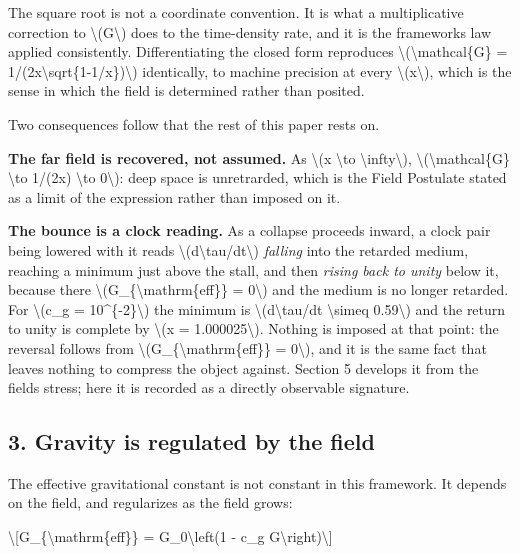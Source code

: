 \documentclass[
  10pt,
]{article}
\begin{document}
The square root is not a coordinate convention. It is what a
multiplicative correction to \textbackslash(G\textbackslash) does to the
time-density rate, and it is the framework\textquotesingle s law applied
consistently. Differentiating the closed form reproduces
\textbackslash(\textbackslash mathcal\{G\} =
1/(2x\textbackslash sqrt\{1-1/x\})\textbackslash) identically, to
machine precision at every \textbackslash(x\textbackslash), which is the
sense in which the field is determined rather than posited.

Two consequences follow that the rest of this paper rests on.

\textbf{The far field is recovered, not assumed.} As \textbackslash(x
\textbackslash to \textbackslash infty\textbackslash),
\textbackslash(\textbackslash mathcal\{G\} \textbackslash to 1/(2x)
\textbackslash to 0\textbackslash): deep space is unretrarded, which is
the Field Postulate stated as a limit of the expression rather than
imposed on it.

\textbf{The bounce is a clock reading.} As a collapse proceeds inward, a
clock pair being lowered with it reads
\textbackslash(d\textbackslash tau/dt\textbackslash) \emph{falling} into
the retarded medium, reaching a minimum just above the stall, and then
\emph{rising back to unity} below it, because there
\textbackslash(G\_\{\textbackslash mathrm\{eff\}\} = 0\textbackslash)
and the medium is no longer retarded. For \textbackslash(c\_g =
10\^{}\{-2\}\textbackslash) the minimum is
\textbackslash(d\textbackslash tau/dt \textbackslash simeq
0.59\textbackslash) and the return to unity is complete by
\textbackslash(x = 1.000025\textbackslash). Nothing is imposed at that
point: the reversal follows from
\textbackslash(G\_\{\textbackslash mathrm\{eff\}\} = 0\textbackslash),
and it is the same fact that leaves nothing to compress the object
against. Section 5 develops it from the field\textquotesingle s stress;
here it is recorded as a directly observable signature.

\hypertarget{gravity-is-regulated-by-the-field}{%
\subsection{3. Gravity is regulated by the
field}\label{gravity-is-regulated-by-the-field}}

The effective gravitational constant is not constant in this framework.
It depends on the field, and regularizes as the field grows:

\textbackslash{[}G\_\{\textbackslash mathrm\{eff\}\} =
G\_0\textbackslash left(1 - c\_g G\textbackslash right)\textbackslash{]}
\end{document}
